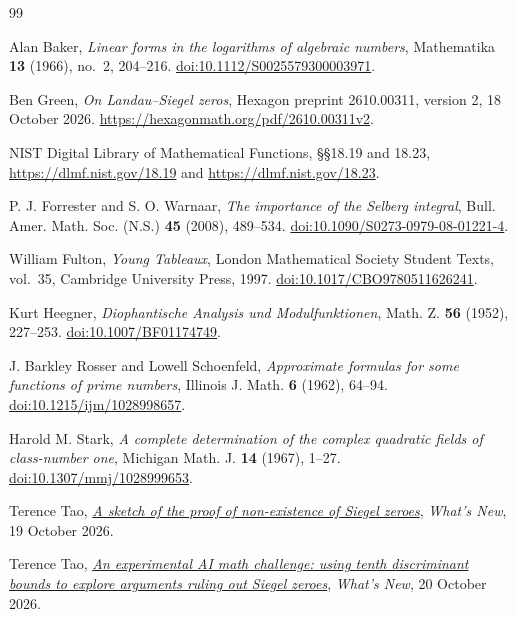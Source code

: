 \begin{thebibliography}{99}
\raggedright

Alan Baker, \emph{Linear forms in the logarithms of algebraic numbers},
Mathematika \textbf{13} (1966), no.~2, 204--216.
\href{https://doi.org/10.1112/S0025579300003971}{doi:10.1112/S0025579300003971}.

Ben Green, \emph{On Landau--Siegel zeros},
Hexagon preprint 2610.00311, version 2, 18 October 2026.
\url{https://hexagonmath.org/pdf/2610.00311v2}.

NIST Digital Library of Mathematical Functions, §§18.19 and 18.23,
\url{https://dlmf.nist.gov/18.19} and \url{https://dlmf.nist.gov/18.23}.

P. J. Forrester and S. O. Warnaar, \emph{The importance of the Selberg integral},
Bull. Amer. Math. Soc. (N.S.) \textbf{45} (2008), 489--534.
\href{https://doi.org/10.1090/S0273-0979-08-01221-4}{doi:10.1090/S0273-0979-08-01221-4}.

William Fulton, \emph{Young Tableaux}, London Mathematical Society Student Texts,
vol.~35, Cambridge University Press, 1997.
\href{https://doi.org/10.1017/CBO9780511626241}{doi:10.1017/CBO9780511626241}.

Kurt Heegner, \emph{Diophantische Analysis und Modulfunktionen},
Math. Z. \textbf{56} (1952), 227--253.
\href{https://doi.org/10.1007/BF01174749}{doi:10.1007/BF01174749}.

J. Barkley Rosser and Lowell Schoenfeld,
\emph{Approximate formulas for some functions of prime numbers},
Illinois J. Math. \textbf{6} (1962), 64--94.
\href{https://doi.org/10.1215/ijm/1028998657}{doi:10.1215/ijm/1028998657}.

Harold M. Stark, \emph{A complete determination of the complex quadratic fields of class-number one},
Michigan Math. J. \textbf{14} (1967), 1--27.
\href{https://doi.org/10.1307/mmj/1028999653}{doi:10.1307/mmj/1028999653}.

Terence Tao, \href{https://terrytao.wordpress.com/2026/10/19/a-sketch-of-the-proof-of-non-existence-of-siegel-zeroes/}{\emph{A sketch of the proof of non-existence of Siegel zeroes}},
\emph{What's New}, 19 October 2026.

Terence Tao, \href{https://terrytao.wordpress.com/2026/10/20/an-experimental-ai-math-challenge-using-tenth-discriminant-bounds-to-explore-arguments-ruling-out-siegel-zeroes/}{\emph{An experimental AI math challenge: using tenth discriminant bounds to explore arguments ruling out Siegel zeroes}},
\emph{What's New}, 20 October 2026.

\end{thebibliography}
